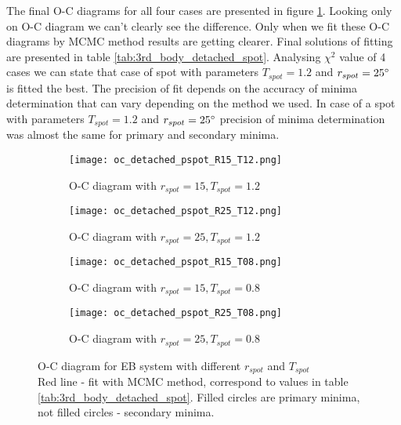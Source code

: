 The final O-C diagrams for all four cases are presented in figure \ref{fig:oc_detached_spot}. Looking only on O-C diagram we can't clearly see the difference. Only when we fit these O-C diagrams by MCMC method results are getting clearer. 
Final solutions of fitting are presented in table \ref{tab:3rd_body_detached_spot}. Analysing $\chi^2$ value of 4 cases we can state that 
case of spot with parameters $T_{spot}=1.2$ and $r_{spot}=25\degree$ is fitted the best. The precision of fit depends on the accuracy of minima determination that can vary depending on the method we used. In case of a spot with parameters $T_{spot}=1.2$ and $r_{spot}=25\degree$ precision of minima determination was almost the same for primary and secondary minima. 


\begin{figure}[!h]
    \centering
    \begin{subfigure}[t]{0.5\textwidth}
        \centering
        \texttt{[image: oc\_detached\_pspot\_R15\_T12.png]}
        \caption{O-C diagram with $r_{spot}=15, T_{spot}=1.2$}
    \end{subfigure}%
    \begin{subfigure}[t]{0.5\textwidth}
        \centering
        \texttt{[image: oc\_detached\_pspot\_R25\_T12.png]}
        \caption{O-C diagram with $r_{spot}=25, T_{spot}=1.2$}
    \end{subfigure}
    
    \begin{subfigure}[t]{0.5\textwidth}
        \centering
        \texttt{[image: oc\_detached\_pspot\_R15\_T08.png]}
        \caption{O-C diagram with $r_{spot}=15, T_{spot}=0.8$}
    \end{subfigure}%
    \begin{subfigure}[t]{0.5\textwidth}
        \centering
        \texttt{[image: oc\_detached\_pspot\_R25\_T08.png]}
        \caption{O-C diagram with $r_{spot}=25, T_{spot}=0.8$}
    \end{subfigure}
    \caption{O-C diagram for EB system with different $r_{spot}$ and $T_{spot}$\\
    Red line - fit with MCMC method, correspond to values in table \ref{tab:3rd_body_detached_spot}. 
    Filled circles are primary minima, not filled circles - secondary minima.}
\label{fig:oc_detached_spot}
\end{figure}


